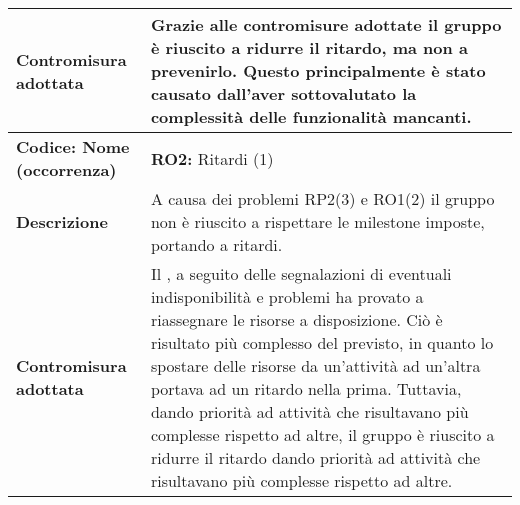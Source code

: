 {\begin{longtable}{C{3.5cm} | C{11cm}}
\textbf{Contromisura adottata} & Grazie alle contromisure adottate il gruppo è riuscito a ridurre il ritardo, ma non a prevenirlo. Questo principalmente è stato causato dall'aver sottovalutato la complessità delle funzionalità mancanti.\\
\hline
\hline
{}\textbf{Codice: Nome (occorrenza)} & \textbf{RO2: }{Ritardi (1)}\\
\textbf{Descrizione} & A causa dei problemi RP2(3) e RO1(2) il gruppo non è riuscito a rispettare le milestone imposte, portando a ritardi.\\
\textbf{Contromisura adottata} & Il \respProg{}, a seguito delle segnalazioni di eventuali indisponibilità e problemi ha provato a riassegnare le risorse a disposizione. Ciò è risultato più complesso del previsto, in quanto lo spostare delle risorse da un'attività ad un'altra portava ad un ritardo nella prima. Tuttavia, dando priorità ad attività che risultavano più complesse rispetto ad altre, il gruppo è riuscito a ridurre il ritardo dando priorità ad attività che risultavano più complesse rispetto ad altre.\\
\hline
\hline
\end{longtable}
}
